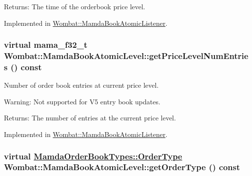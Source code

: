 \begin{Desc}
\item[Returns:]The time of the orderbook price level. \end{Desc}


Implemented in \hyperlink{classWombat_1_1MamdaBookAtomicListener_85bb50891ec86cc8e1850b4097498a89}{Wombat::Mamda\-Book\-Atomic\-Listener}.\hypertarget{classWombat_1_1MamdaBookAtomicLevel_8a11dfebeccc889960a783b7e4377735}{
\subsubsection[getPriceLevelNumEntries]{\setlength{\rightskip}{0pt plus 5cm}virtual mama\_\-f32\_\-t Wombat::Mamda\-Book\-Atomic\-Level::get\-Price\-Level\-Num\-Entries () const}}
\label{classWombat_1_1MamdaBookAtomicLevel_8a11dfebeccc889960a783b7e4377735}


Number of order book entries at current price level. 

\begin{Desc}
\item[Warning:]Not supported for V5 entry book updates.\end{Desc}
\begin{Desc}
\item[Returns:]The number of entries at the current price level. \end{Desc}


Implemented in \hyperlink{classWombat_1_1MamdaBookAtomicListener_85367024e7790ce720c241849bf38ec2}{Wombat::Mamda\-Book\-Atomic\-Listener}.\hypertarget{classWombat_1_1MamdaBookAtomicLevel_23ff595e16fe3926bb2714c5c2026841}{
\subsubsection[getOrderType]{\setlength{\rightskip}{0pt plus 5cm}virtual \hyperlink{classWombat_1_1MamdaOrderBookTypes_b1b75d93c83c5a1042c392ab46a27291}{Mamda\-Order\-Book\-Types::Order\-Type} Wombat::Mamda\-Book\-Atomic\-Level::get\-Order\-Type () const}}
\label{classWombat_1_1MamdaBookAtomicLevel_23ff595e16fe3926bb2714c5c2026841}


